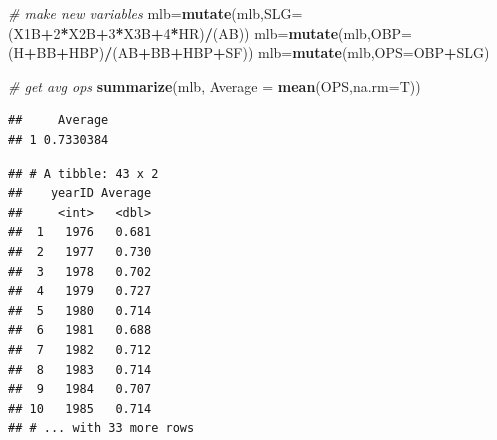 \documentclass[]{article}
\newenvironment{Shaded}{\begin{snugshade}}{\end{snugshade}}
\newcommand{\CommentTok}[1]{\textcolor[rgb]{0.56,0.35,0.01}{\textit{#1}}}
\newcommand{\DataTypeTok}[1]{\textcolor[rgb]{0.13,0.29,0.53}{#1}}
\newcommand{\DecValTok}[1]{\textcolor[rgb]{0.00,0.00,0.81}{#1}}
\newcommand{\KeywordTok}[1]{\textcolor[rgb]{0.13,0.29,0.53}{\textbf{#1}}}
\newcommand{\NormalTok}[1]{#1}
\newcommand{\OperatorTok}[1]{\textcolor[rgb]{0.81,0.36,0.00}{\textbf{#1}}}
\begin{document}
\begin{Shaded}
\begin{Highlighting}[]
\CommentTok{# make new variables}
\NormalTok{mlb=}\KeywordTok{mutate}\NormalTok{(mlb,}\DataTypeTok{SLG=}\NormalTok{(X1B}\OperatorTok{+}\DecValTok{2}\OperatorTok{*}\NormalTok{X2B}\OperatorTok{+}\DecValTok{3}\OperatorTok{*}\NormalTok{X3B}\OperatorTok{+}\DecValTok{4}\OperatorTok{*}\NormalTok{HR)}\OperatorTok{/}\NormalTok{(AB))}
\NormalTok{mlb=}\KeywordTok{mutate}\NormalTok{(mlb,}\DataTypeTok{OBP=}\NormalTok{(H}\OperatorTok{+}\NormalTok{BB}\OperatorTok{+}\NormalTok{HBP)}\OperatorTok{/}\NormalTok{(AB}\OperatorTok{+}\NormalTok{BB}\OperatorTok{+}\NormalTok{HBP}\OperatorTok{+}\NormalTok{SF))}
\NormalTok{mlb=}\KeywordTok{mutate}\NormalTok{(mlb,}\DataTypeTok{OPS=}\NormalTok{OBP}\OperatorTok{+}\NormalTok{SLG)}

\CommentTok{# get avg ops}
\KeywordTok{summarize}\NormalTok{(mlb, }\DataTypeTok{Average =} \KeywordTok{mean}\NormalTok{(OPS,}\DataTypeTok{na.rm=}\NormalTok{T))}
\end{Highlighting}
\end{Shaded}

\begin{verbatim}
##     Average
## 1 0.7330384
\end{verbatim}

\begin{Shaded}
\end{Shaded}

\begin{verbatim}
## # A tibble: 43 x 2
##    yearID Average
##     <int>   <dbl>
##  1   1976   0.681
##  2   1977   0.730
##  3   1978   0.702
##  4   1979   0.727
##  5   1980   0.714
##  6   1981   0.688
##  7   1982   0.712
##  8   1983   0.714
##  9   1984   0.707
## 10   1985   0.714
## # ... with 33 more rows
\end{verbatim}

\begin{Shaded}
\end{Shaded}
\end{document}
